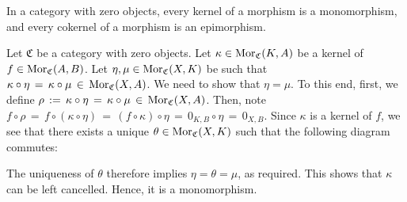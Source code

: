 
\vskip 0.5cm
\begin{proposition}
\mbox{}
\vskip 0.1cm
\noindent
In a category with zero objects, every kernel of a morphism is a monomorphism, and
every cokernel of a morphism is an epimorphism.
\end{proposition}
\proof
Let $\mathfrak{C}$ be a category with zero objects.
Let $\kappa \in \textnormal{Mor}_{\mathfrak{C}}(K,A)$ be a kernel of $f \in \textnormal{Mor}_{\mathfrak{C}}(A,B)$.
Let $\eta, \mu \in \textnormal{Mor}_{\mathfrak{C}}(X,K)$ be such that
$\kappa \circ \eta \,=\, \kappa \circ \mu \,\in\, \textnormal{Mor}_{\mathfrak{C}}(X,A)$.
We need to show that $\eta = \mu$.
To this end, first, we define $\rho \,:=\, \kappa \circ \eta \,=\, \kappa \circ \mu \,\in\, \textnormal{Mor}_{\mathfrak{C}}(X,A)$.
Then, note
$f \circ \rho \,=\, f \circ (\kappa \circ \eta) \,=\, (f \circ \kappa) \circ \eta \,=\, 0_{K,B} \circ \eta \,=\, 0_{X,B}$.
Since $\kappa$ is a kernel of $f$, we see that there exists a unique $\theta \in \textnormal{Mor}_{\mathfrak{C}}(X,K)$ such that
the following diagram commutes:
\begin{center}
\end{center}
The uniqueness of $\theta$ therefore implies $\eta = \theta = \mu$, as required.
This shows that $\kappa$ can be left cancelled.
Hence, it is a monomorphism.

